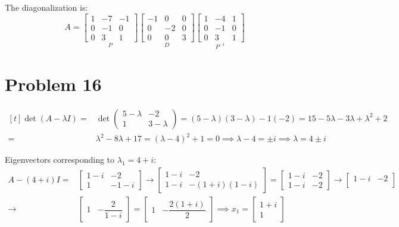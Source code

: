 \documentclass{article}
\newcommand*{\problem}[1]{\section*{Problem #1}}
\begin{document}
The diagonalization is:
\begin{equation*}
	A=
	\underset{P}{\begin{bmatrix}
		1 & -7 & -1 \\
		0 & -1 & 0 \\
		0 & 3 & 1
	\end{bmatrix}}
	\underset{D}{\begin{bmatrix}
		-1 & 0 & 0 \\
		0 & -2 & 0 \\
		0 & 0 & 3
	\end{bmatrix}}
	\underset{P^{-1}}{\begin{bmatrix}
		1 & -4 & 1 \\
		0 & -1 & 0 \\
		0 & 3 & 1
	\end{bmatrix}}
\end{equation*}

\pagebreak

\problem{16}
$\begin{aligned}[t]
    \det(A-\lambda I)
	={}&\det \begin{pmatrix}
		5-\lambda & -2 \\
		1 & 3-\lambda
	\end{pmatrix}
	=(5-\lambda)(3-\lambda)-1(-2)
	=15-5\lambda-3\lambda+\lambda^2+2 \\
	={}&\lambda^2-8\lambda+17
	=(\lambda-4)^2+1=0
	\implies \lambda-4=\pm i
	\implies \lambda=4\pm i
\end{aligned}$

Eigenvectors corresponding to $\lambda_1=4+i$:
\begin{align*}
    A-(4+i)I
	={}&\begin{bmatrix}
		1-i & -2 \\
		1 & -1-i
	\end{bmatrix}
	\rightarrow\begin{bmatrix}
		1-i & -2 \\
		1-i & -(1+i)(1-i)
	\end{bmatrix}
	=\begin{bmatrix}
		1-i & -2 \\
		1-i & -2
	\end{bmatrix}
	\rightarrow\begin{bmatrix}
		1-i & -2 \\
	\end{bmatrix} \\
	\rightarrow{}& \begin{bmatrix}
		1 & -\dfrac{2}{1-i}
	\end{bmatrix}
	= \begin{bmatrix}
		1 & -\dfrac{2(1+i)}{2}
	\end{bmatrix}
	\implies x_1=\begin{bmatrix}
	    1+i \\
		1
	\end{bmatrix}
\end{align*}
\end{document}
